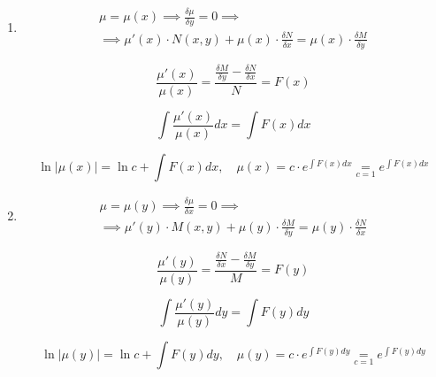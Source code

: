 \documentclass{report}
\theoremstyle{definition}
\begin{document}
\begin{enumerate}
    \item \begin{multline*}
              \mu = \mu(x) \implies \frac{\delta \mu}{\delta y} = 0 \implies \\
              \implies \mu'(x) \cdot N(x,y) + \mu(x)\cdot \frac{\delta N}{\delta x} = \mu(x)\cdot \frac{\delta M}{\delta y}
          \end{multline*}

          \begin{equation*}
              \frac{\mu'(x)}{\mu(x)} = \frac{\frac{\delta M}{\delta y} - \frac{\delta N}{\delta x}}{N} = F(x)
          \end{equation*}

          \begin{equation*}
              \int\frac{\mu'(x)}{\mu(x)}dx = \int F(x)dx
          \end{equation*}

          \begin{equation*}
              \ln|\mu(x)| = \ln c + \int F(x)dx, \quad \mu(x) = c\cdot e^{\int F(x)dx} \underset{c = 1}{=} e^{\int F(x)dx}
          \end{equation*}

    \item \begin{multline*}
              \mu = \mu(y) \implies \frac{\delta \mu}{\delta x} = 0 \implies \\
              \implies \mu'(y) \cdot M(x,y) + \mu(y)\cdot \frac{\delta M}{\delta y} = \mu(y)\cdot \frac{\delta N}{\delta x}
          \end{multline*}

          \begin{equation*}
              \frac{\mu'(y)}{\mu(y)} = \frac{\frac{\delta N}{\delta x} - \frac{\delta M}{\delta y}}{M} = F(y)
          \end{equation*}

          \begin{equation*}
              \int\frac{\mu'(y)}{\mu(y)}dy = \int F(y)dy
          \end{equation*}

          \begin{equation*}
              \ln|\mu(y)| = \ln c + \int F(y)dy, \quad \mu(y) = c\cdot e^{\int F(y)dy} \underset{c = 1}{=} e^{\int F(y)dy}
          \end{equation*}


\end{enumerate}
\end{document}
